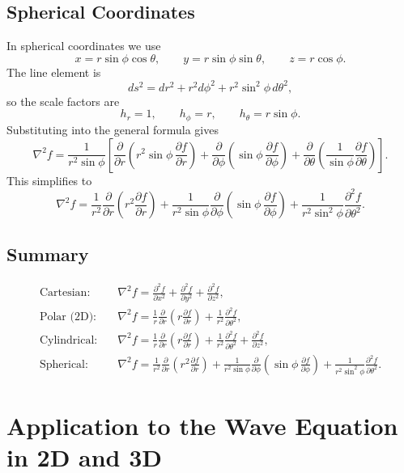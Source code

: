 \documentclass{report}
\numberwithin{equation}{section}
\begin{document}
\subsection{Spherical Coordinates}

In spherical coordinates we use
\[
x=r\sin\phi\cos\theta,\qquad
y=r\sin\phi\sin\theta,\qquad
z=r\cos\phi.
\]
The line element is
\[
ds^2 = dr^2 + r^2 d\phi^2 + r^2 \sin^2\phi\, d\theta^2,
\]
so the scale factors are
\[
h_r=1,\qquad h_\phi=r,\qquad h_\theta=r\sin\phi.
\]
Substituting into the general formula gives
\[
\nabla^2 f
=
\frac{1}{r^2\sin\phi}
\left[
\frac{\partial}{\partial r}\left(r^2\sin\phi\,\frac{\partial f}{\partial r}\right)
+
\frac{\partial}{\partial \phi}\left(\sin\phi\,\frac{\partial f}{\partial \phi}\right)
+
\frac{\partial}{\partial \theta}\left(\frac{1}{\sin\phi}\frac{\partial f}{\partial \theta}\right)
\right].
\]
This simplifies to
\[
\nabla^2 f
=
\frac{1}{r^2}\frac{\partial}{\partial r}\left(r^2\frac{\partial f}{\partial r}\right)
+
\frac{1}{r^2\sin\phi}\frac{\partial}{\partial \phi}\left(\sin\phi\,\frac{\partial f}{\partial \phi}\right)
+
\frac{1}{r^2\sin^2\phi}\frac{\partial^2 f}{\partial \theta^2}.
\]

\subsection*{Summary}

\[
\begin{aligned}
\text{Cartesian:}\quad &
\nabla^2 f =
\frac{\partial^2 f}{\partial x^2}
+
\frac{\partial^2 f}{\partial y^2}
+
\frac{\partial^2 f}{\partial z^2}, \\[8pt]
\text{Polar (2D):}\quad &
\nabla^2 f =
\frac{1}{r}\frac{\partial}{\partial r}\left(r\frac{\partial f}{\partial r}\right)
+
\frac{1}{r^2}\frac{\partial^2 f}{\partial \theta^2}, \\[10pt]
\text{Cylindrical:}\quad &
\nabla^2 f =
\frac{1}{r}\frac{\partial}{\partial r}\left(r\frac{\partial f}{\partial r}\right)
+
\frac{1}{r^2}\frac{\partial^2 f}{\partial \theta^2}
+
\frac{\partial^2 f}{\partial z^2}, \\[10pt]
\text{Spherical:}\quad &
\nabla^2 f =
\frac{1}{r^2}\frac{\partial}{\partial r}\left(r^2\frac{\partial f}{\partial r}\right)
+
\frac{1}{r^2\sin\phi}\frac{\partial}{\partial \phi}\left(\sin\phi\,\frac{\partial f}{\partial \phi}\right)
+
\frac{1}{r^2\sin^2\phi}\frac{\partial^2 f}{\partial \theta^2}.
\end{aligned}
\]

\section{Application to the Wave Equation in 2D and 3D}
\end{document}
